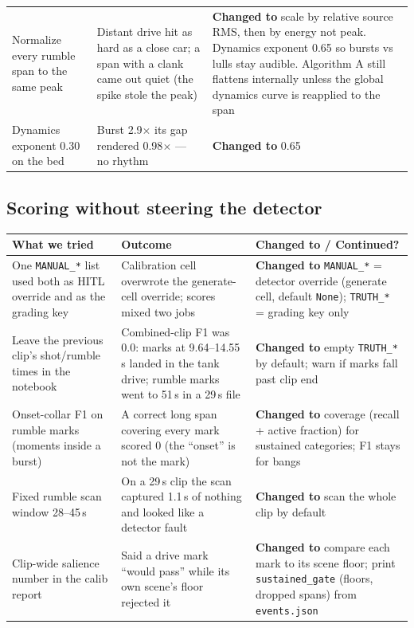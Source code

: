 \documentclass[11pt,a4paper]{article}
\begin{document}
\begin{center}
\begin{tabularx}{\textwidth}{@{}>{\raggedright\arraybackslash}p{4cm}>{\raggedright\arraybackslash}p{4cm}>{\raggedright\arraybackslash}X@{}}
\addlinespace
Normalize every rumble span to the same peak & Distant drive hit as hard as a close car; a span with a clank came out quiet (the spike stole the peak) & \textbf{Changed to} scale by relative source RMS, then by energy not peak. Dynamics exponent 0.65 so bursts vs lulls stay audible. Algorithm A still flattens internally unless the global dynamics curve is reapplied to the span \\
\addlinespace
Dynamics exponent 0.30 on the bed & Burst 2.9$\times$ its gap rendered 0.98$\times$ --- no rhythm & \textbf{Changed to} 0.65 \\
\bottomrule
\end{tabularx}
\end{center}

\subsection*{Scoring without steering the detector}
\begin{center}
\small
\begin{tabularx}{\textwidth}{@{}>{\raggedright\arraybackslash}p{4cm}>{\raggedright\arraybackslash}p{4cm}>{\raggedright\arraybackslash}X@{}}
\toprule
\textbf{What we tried} & \textbf{Outcome} & \textbf{Changed to / Continued?} \\
\midrule
One \texttt{MANUAL\_*} list used both as HITL override and as the grading key & Calibration cell overwrote the generate-cell override; scores mixed two jobs & \textbf{Changed to} \texttt{MANUAL\_*} = detector override (generate cell, default \texttt{None}); \texttt{TRUTH\_*} = grading key only \\
\addlinespace
Leave the previous clip's shot/rumble times in the notebook & Combined-clip F1 was 0.0: marks at 9.64--14.55\,s landed in the tank drive; rumble marks went to 51\,s in a 29\,s file & \textbf{Changed to} empty \texttt{TRUTH\_*} by default; warn if marks fall past clip end \\
\addlinespace
Onset-collar F1 on rumble marks (moments inside a burst) & A correct long span covering every mark scored 0 (the ``onset'' is not the mark) & \textbf{Changed to} coverage (recall + active fraction) for sustained categories; F1 stays for bangs \\
\addlinespace
Fixed rumble scan window 28--45\,s & On a 29\,s clip the scan captured 1.1\,s of nothing and looked like a detector fault & \textbf{Changed to} scan the whole clip by default \\
\addlinespace
Clip-wide salience number in the calib report & Said a drive mark ``would pass'' while its own scene's floor rejected it & \textbf{Changed to} compare each mark to its scene floor; print \texttt{sustained\_gate} (floors, dropped spans) from \texttt{events.json} \\
\bottomrule
\end{tabularx}
\end{center}
\end{document}
